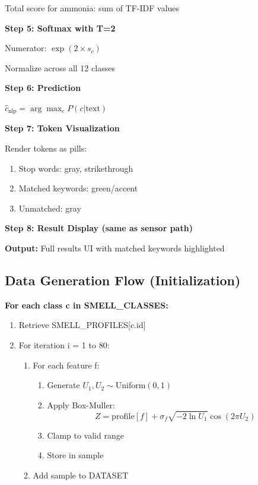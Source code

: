 \documentclass[12pt,a4paper]{article}
\begin{document}
Total score for ammonia: sum of TF-IDF values

\textbf{Step 5: Softmax with T=2}

Numerator: $\exp(2 \times s_c)$

Normalize across all 12 classes

\textbf{Step 6: Prediction}

$\hat{c}_{\text{nlp}} = \arg\max_c P(c|\text{text})$

\textbf{Step 7: Token Visualization}

Render tokens as pills:
\begin{enumerate}
    \item Stop words: gray, strikethrough
    \item Matched keywords: green/accent
    \item Unmatched: gray
\end{enumerate}

\textbf{Step 8: Result Display (same as sensor path)}

\textbf{Output:} Full results UI with matched keywords highlighted

\subsection{Data Generation Flow (Initialization)}

\textbf{For each class c in SMELL\_CLASSES:}

\begin{enumerate}
    \item Retrieve SMELL\_PROFILES[c.id]
    \item For iteration i = 1 to 80:
    \begin{enumerate}
        \item For each feature f:
        \begin{enumerate}
            \item Generate $U_1, U_2 \sim \text{Uniform}(0,1)$
            \item Apply Box-Muller:
            $$Z = \text{profile}[f] + \sigma_f \sqrt{-2\ln U_1} \cos(2\pi U_2)$$
            \item Clamp to valid range
            \item Store in sample
        \end{enumerate}
        \item Add sample to DATASET
    \end{enumerate}
\end{enumerate}
\end{document}

